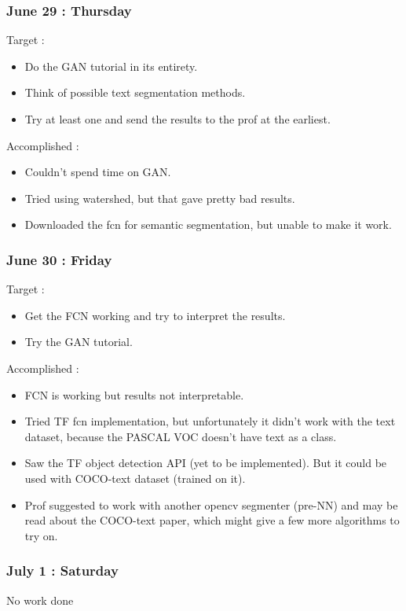 \documentclass{article}
\begin{document}
\subsubsection{June 29 : Thursday}
Target :
\begin{itemize}
\item Do the GAN tutorial in its entirety.
\item Think of possible text segmentation methods.
\item Try at least one and send the results to the prof at the earliest.
\end{itemize}

Accomplished :
\begin{itemize}
\item Couldn't spend time on GAN.
\item Tried using watershed, but that gave pretty bad results.
\item Downloaded the fcn for semantic segmentation, but unable to make it work.
\end{itemize}

\subsubsection{June 30 : Friday}
Target :
\begin{itemize}
\item Get the FCN working and try to interpret the results.
\item Try the GAN tutorial.
\end{itemize}

Accomplished :
\begin{itemize}
\item FCN is working but results not interpretable.
\item Tried TF fcn implementation, but unfortunately it didn't work with the text dataset, because the PASCAL VOC doesn't have text as a class.
\item Saw the TF object detection API (yet to be implemented). But it could be used with COCO-text dataset (trained on it).
\item Prof suggested to work with another opencv segmenter (pre-NN) and may be read about the COCO-text paper, which might give a few more algorithms to try on.
\end{itemize}

\subsubsection{July 1 : Saturday}
No work done
\end{document}
